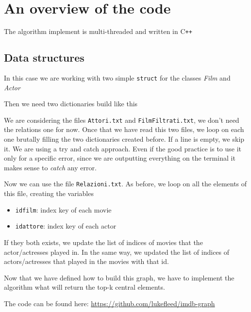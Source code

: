 \section{An overview of the code}
The algorithm implement is multi-threaded and written in C\texttt{++}

\subsection{Data structures}
In this case we are working with two simple \texttt{struct} for the classes \emph{Film} and \emph{Actor}


\s
\nd Then we need two dictionaries build like this


\s
\nd We are considering the files \texttt{Attori.txt} and \texttt{FilmFiltrati.txt}, we don't need the relations one for now. Once that we have read this two files, we loop on each one brutally filling the two dictionaries created before. If a line is empty, we skip it. We are using a try and catch approach. Even if the good practice is to use it only for a specific error, since we are outputting everything on the terminal it makes sense to \emph{catch} any error.


\s

Now we can use the file \texttt{Relazioni.txt}. As before, we loop on all the elements of this file, creating the variables

\begin{itemize}
    \item \texttt{id\textunderscore film}: index key of each movie
    \item \texttt{id\textunderscore attore}: index key of each actor
\end{itemize}

\nd If they both exists, we update the list of indices of movies that the actor/actresses played in. In the same way, we updated the list of indices of actors/actresses that played in the movies with that id.


\s
Now that we have defined how to build this graph, we have to implement the algorithm what will return the top-k central elements. \s

\nd The code can be found here: \url{https://github.com/lukefleed/imdb-graph}
\s
\begin{center}
\end{center}
